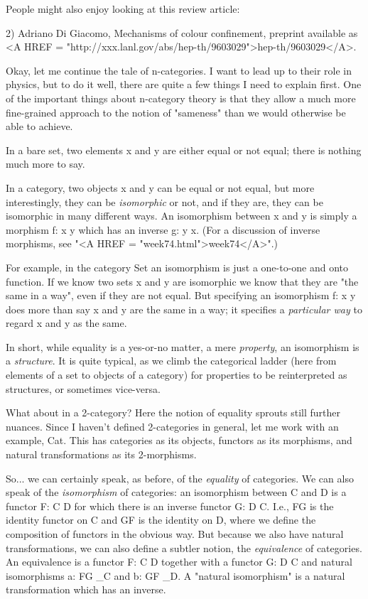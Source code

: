 People might also enjoy looking at this review article:

2) Adriano Di Giacomo, Mechanisms of colour confinement, preprint
available as <A HREF = "http://xxx.lanl.gov/abs/hep-th/9603029">hep-th/9603029</A>.  


Okay, let me continue the tale of n-categories.  I want to lead up to
their role in physics, but to do it well, there are quite a few things I
need to explain first.  One of the important things about n-category
theory is that they allow a much more fine-grained approach to the notion of
"sameness" than we would otherwise be able to achieve.  

In a bare set, two elements x and y are either equal or not equal;
there is nothing much more to say.  

In a category, two objects x and y can be equal or not equal, but more
interestingly, they can be \emph{isomorphic} or not, and if they are, they
can be isomorphic in many different ways.  An isomorphism between x and
y is simply a morphism f: x \to  y which has an inverse g: y \to  x.  (For
a discussion of inverse morphisms, see "<A HREF = "week74.html">week74</A>".)

For example, in the category Set an isomorphism is just a one-to-one and
onto function.  If we know two sets x and y are isomorphic we know that
they are "the same in a way", even if they are not equal.  But
specifying an isomorphism f: x \to  y does more than say x and y are the
same in a way; it specifies a \emph{particular way} to regard x and y as the
same.

In short, while equality is a yes-or-no matter, a mere \emph{property}, an
isomorphism is a \emph{structure}.  It is quite typical, as we climb the
categorical ladder (here from elements of a set to objects of a
category) for properties to be reinterpreted as structures, or sometimes
vice-versa.  

What about in a 2-category?  Here the notion of equality sprouts still
further nuances.  Since I haven't defined 2-categories in general, let
me work with an example, Cat.  This has categories as its objects,
functors as its morphisms, and natural transformations as its
2-morphisms.


So... we can certainly speak, as before, of the \emph{equality} of
categories.  We can also speak of the \emph{isomorphism} of
categories: an isomorphism between C and D is a functor F: C \to  D for
which there is an inverse functor G: D \to  C.  I.e., FG is the
identity functor on C and GF is the identity on D, where we define the
composition of functors in the obvious way.  But because we also have
natural transformations, we can also define a subtler notion, the
\emph{equivalence} of categories.  An equivalence is a functor F: C
\to  D together with a functor G: D \to  C and natural isomorphisms a:
FG _{C} and b: GF _{D}.  A "natural
isomorphism" is a natural transformation which has an inverse.

